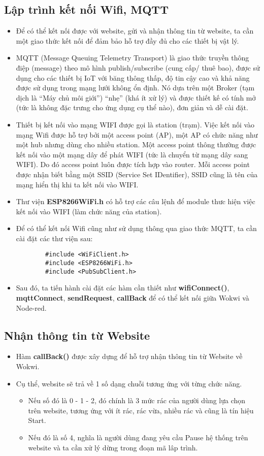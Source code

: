 \documentclass[12pt, a4paper]{article}
\begin{document}
\subsection{Lập trình kết nối Wifi, MQTT}
\begin{itemize}
    \item Để có thể kết nối được với website, gửi và nhận thông tin từ website, ta cần một giao thức kết nối để đảm bảo hỗ trợ đầy đủ cho các thiết bị vật lý.
    \item MQTT (Message Queuing Telemetry Transport) là giao thức truyền thông điệp (message) theo mô hình publish/subscribe (cung cấp/ thuê bao), được sử dụng cho các thiết bị IoT với băng thông thấp, độ tin cậy cao và khả năng được sử dụng trong mạng lưới không ổn định. Nó dựa trên một Broker (tạm dịch là “Máy chủ môi giới”) “nhẹ” (khá ít xử lý) và được thiết kế có tính mở (tức là không đặc trưng cho ứng dụng cụ thể nào), đơn giản và dễ cài đặt.
    \item Thiết bị kết nối vào mạng WIFI được gọi là station (trạm). Việc kết nối vào mạng Wifi được hỗ trợ bởi một access point (AP), một AP có chức năng như một hub nhưng dùng cho nhiều station. Một access point thông thường được kết nối vào một mạng dây để phát WIFI (tức là chuyển từ mạng dây sang WIFI). Do đó access point luôn được tích hợp vào router. Mỗi access point được nhận biết bằng một SSID (Service Set IDentifier), SSID cũng là tên của mạng hiển thị khi ta kết nối vào WIFI.
    \item Thư viện \textbf{ESP8266WiFi.h} có hỗ trợ các câu lệnh để module thưc hiện việc kết nối vào WIFI (làm chức năng của station).
    \item Để có thể kết nối Wifi cũng như sử dụng thông qua giao thức MQTT, ta cần cài đặt các thư viện sau:
    \begin{lstlisting}
        #include <WiFiClient.h>
        #include <ESP8266WiFi.h>
        #include <PubSubClient.h>\end{lstlisting}
    \item Sau đó, ta tiến hành cài đặt các hàm cần thiết như \textbf{wifiConnect()}, \textbf{mqttConnect}, \textbf{sendRequest}, \textbf{callBack} để có thể kết nối giữa Wokwi và Node-red.
\end{itemize}
\subsection{Nhận thông tin từ Website}
\begin{itemize}
    \item Hàm \textbf{callBack()} được xây dựng để hỗ trợ nhận thông tin từ Website về Wokwi.
    \item Cụ thể, website sẽ trả về 1 số dạng chuỗi tương ứng với từng chức năng.
    \begin{itemize}
        \item Nếu số đó là 0 - 1 - 2, đó chính là 3 mức rác của người dùng lựa chọn trên website, tương ứng với ít rác, rác vừa, nhiều rác và cũng là tín hiệu Start.
        \item Nếu đó là số 4, nghĩa là người dùng đang yêu cầu Pause hệ thống trên website và ta cần xử lý dừng trong đoạn mã lâp trình.
    \end{itemize}
\end{itemize}
\end{document}
